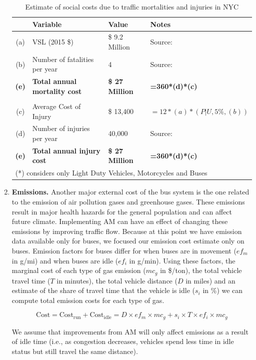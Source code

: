 \documentclass[11pt, letterpaper]{article}
\begin{document}
\begin{enumerate}[leftmargin=*]
\begin{table}[h]
\caption{Estimate of social costs due to traffic mortalities and injuries in NYC}
\centering
\small
\renewcommand{\arraystretch}{1.1}
\begin{tabular}{c l l l}
\hline
 	& Variable 							& Value 				& Notes 						\\\hline\hline
(a)	& VSL (2015 \$)						& \$ 9.2 Million			& Source:						\\
(b)	& Number of fatalities per year				& 4					& Source:			\\
\textbf{(e)}	& \textbf{Total annual mortality cost}	& \textbf{\$ 27 Million}	& \textbf{=360*(d)*(c)}			\\
\\
(c)	& Average Cost of Injury 					& \$ 13,400			& $=12*(a)*(P | U, 5\%, (b))$		\\
(d)	& Number of injuries per year				& 40,000				& Source: 						\\
\textbf{(e)}	& \textbf{Total annual injury cost}	& \textbf{\$ 27 Million}	& \textbf{=360*(d)*(c)}			\\\hline\hline
\multicolumn{4}{l}{{\footnotesize (*) considers only Light Duty Vehicles, Motorcycles and Buses}}
\end{tabular}
\label{tab:mortality.cost}
\end{table}%

\item \textbf{Emissions.}
  Another major external cost of the bus system is the one related to
  the emission of air pollution gases and greenhouse gases. These emissions result
  in major health hazards for the general population and can affect future climate. Implementing 
  AM can have an effect of changing these emissions by improving traffic flow. Because at this point 
  we have emission data available only for buses, we focused our emission cost estimate only on 
  buses. Emission factors for buses differ for when buses are in movement ($ef_m$ in g/mi) 
  and when buses are idle ($ef_{i}$ in g/min). Using these factors, the marginal cost of each type 
  of gas emission ($mc_g$ in \$/ton), the total vehicle travel time ($T$ in minutes), 
  the total vehicle distance ($D$ in miles) and an estimate of the share of travel time that 
  the vehicle is idle ($s_i$ in \%) we can compute total emission costs for each type of gas.

  \[\mbox{Cost}=\mbox{Cost}_{\mbox{run}}+\mbox{Cost}_{\mbox{idle}} = D \times ef_m \times mc_g +  s_i \times T \times  ef_i \times mc_g\]
  
  We assume that improvements from AM will only affect emissions as a result of idle time 
  (i.e., as congestion decreases, vehicles spend less time in idle status but still travel the same distance).
  
\end{enumerate}
\end{document}
